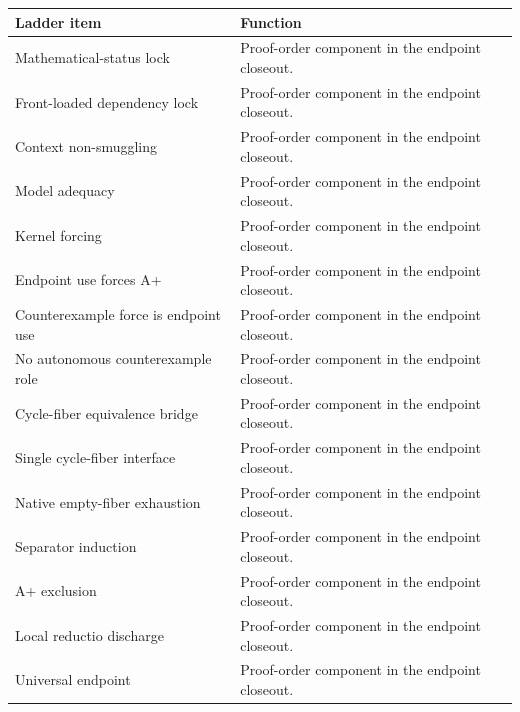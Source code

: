 \documentclass[11pt]{article}
\begin{document}
\begin{longtable}{p{}p{}}\toprule Ladder item & Function \\\midrule\endhead

Mathematical-status lock & Proof-order component in the endpoint closeout. \\

Front-loaded dependency lock & Proof-order component in the endpoint closeout. \\

Context non-smuggling & Proof-order component in the endpoint closeout. \\

Model adequacy & Proof-order component in the endpoint closeout. \\

Kernel forcing & Proof-order component in the endpoint closeout. \\

Endpoint use forces A+ & Proof-order component in the endpoint closeout. \\

Counterexample force is endpoint use & Proof-order component in the endpoint closeout. \\

No autonomous counterexample role & Proof-order component in the endpoint closeout. \\

Cycle-fiber equivalence bridge & Proof-order component in the endpoint closeout. \\

Single cycle-fiber interface & Proof-order component in the endpoint closeout. \\

Native empty-fiber exhaustion & Proof-order component in the endpoint closeout. \\

Separator induction & Proof-order component in the endpoint closeout. \\

A+ exclusion & Proof-order component in the endpoint closeout. \\

Local reductio discharge & Proof-order component in the endpoint closeout. \\

Universal endpoint & Proof-order component in the endpoint closeout. \\

\bottomrule\end{longtable}
\end{document}
